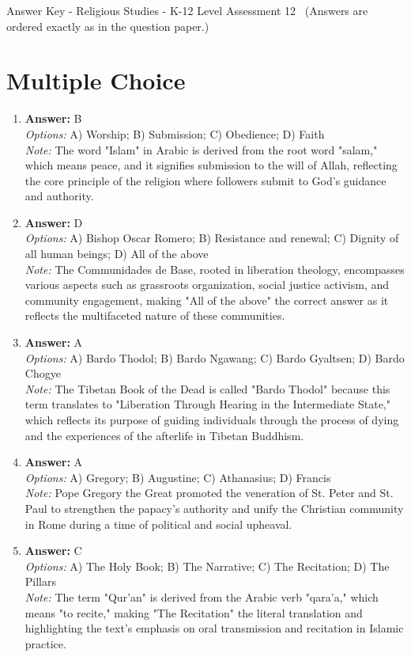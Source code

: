 \documentclass[12pt]{article}
\begin{document}
\begin{center}
Answer Key - Religious Studies - K-12 Level Assessment 12 \
\small (Answers are ordered exactly as in the question paper.)
\end{center}

\section*{Multiple Choice}
\begin{enumerate}[label=\arabic*.]
\item \textbf{Answer:} B
\\ \textit{Options:} A) Worship; B) Submission; C) Obedience; D) Faith
\\ \textit{Note:} The word "Islam" in Arabic is derived from the root word "salam," which means peace, and it signifies submission to the will of Allah, reflecting the core principle of the religion where followers submit to God's guidance and authority.
\item \textbf{Answer:} D
\\ \textit{Options:} A) Bishop Oscar Romero; B) Resistance and renewal; C) Dignity of all human beings; D) All of the above
\\ \textit{Note:} The Communidades de Base, rooted in liberation theology, encompasses various aspects such as grassroots organization, social justice activism, and community engagement, making "All of the above" the correct answer as it reflects the multifaceted nature of these communities.
\item \textbf{Answer:} A
\\ \textit{Options:} A) Bardo Thodol; B) Bardo Ngawang; C) Bardo Gyaltsen; D) Bardo Chogye
\\ \textit{Note:} The Tibetan Book of the Dead is called "Bardo Thodol" because this term translates to "Liberation Through Hearing in the Intermediate State," which reflects its purpose of guiding individuals through the process of dying and the experiences of the afterlife in Tibetan Buddhism.
\item \textbf{Answer:} A
\\ \textit{Options:} A) Gregory; B) Augustine; C) Athanasius; D) Francis
\\ \textit{Note:} Pope Gregory the Great promoted the veneration of St. Peter and St. Paul to strengthen the papacy's authority and unify the Christian community in Rome during a time of political and social upheaval.
\item \textbf{Answer:} C
\\ \textit{Options:} A) The Holy Book; B) The Narrative; C) The Recitation; D) The Pillars
\\ \textit{Note:} The term "Qur'an" is derived from the Arabic verb "qara'a," which means "to recite," making "The Recitation" the literal translation and highlighting the text's emphasis on oral transmission and recitation in Islamic practice.
\end{enumerate}
\end{document}
